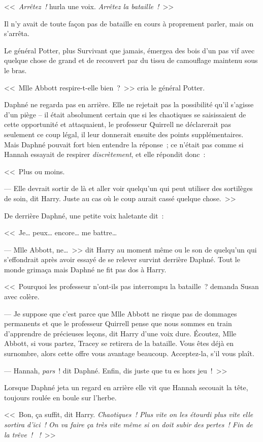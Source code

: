 <<~\emph{Arrêtez~!} hurla une voix. \emph{Arrêtez la bataille~!}~>>

Il n'y avait de toute façon pas de bataille en cours à proprement parler, mais on s'arrêta.

Le général Potter, plus Survivant que jamais, émergea des bois d'un pas vif avec quelque chose de grand et de recouvert par du tissu de camouflage maintenu sous le bras.

<<~Mlle Abbott respire-t-elle bien~?~>> cria le général Potter.

Daphné ne regarda pas en arrière. Elle ne rejetait pas la possibilité qu'il s'agisse d'un piège -- il était absolument certain que si les chaotiques se saisissaient de cette opportunité et attaquaient, le professeur Quirrell ne déclarerait pas seulement ce coup légal, il leur donnerait ensuite des points supplémentaires. Mais Daphné pouvait fort bien entendre la réponse~; ce n'était pas comme si Hannah essayait de respirer \emph{discrètement}, et elle répondit donc~:

<<~Plus ou moins.

--- Elle devrait sortir de là et aller voir quelqu'un qui peut utiliser des sortilèges de soin, dit Harry. Juste au cas où le coup aurait cassé quelque chose.~>>

De derrière Daphné, une petite voix haletante dit~:

<<~Je… peux… encore… me battre…

--- Mlle Abbott, ne…~>> dit Harry au moment même ou le son de quelqu'un qui s'effondrait après avoir essayé de se relever survint derrière Daphné. Tout le monde grimaça mais Daphné ne fit pas dos à Harry.

<<~Pourquoi les professeur n'ont-ils pas interrompu la bataille~? demanda Susan avec colère.

--- Je suppose que c'est parce que Mlle Abbott ne risque pas de dommages permanents et que le professeur Quirrell pense que nous sommes en train d'apprendre de précieuses leçons, dit Harry d'une voix dure. Écoutez, Mlle Abbott, si vous partez, Tracey se retirera de la bataille. Vous êtes déjà en surnombre, alors cette offre vous avantage beaucoup. Acceptez-la, s'il vous plaît.

--- Hannah, \emph{pars}~! dit Daphné. Enfin, dis juste que tu es hors jeu~!~>>

Lorsque Daphné jeta un regard en arrière elle vit que Hannah secouait la tête, toujours roulée en boule sur l'herbe.

<<~Bon, ça suffit, dit Harry. \emph{Chaotiques~! Plus vite on les étourdi plus vite elle sortira d'ici~! On va faire ça très vite même si on doit subir des pertes~! Fin de la trêve~! ~!}~>>

